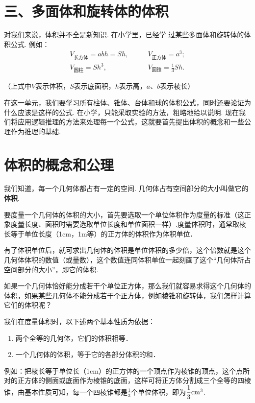 \section*{三、多面体和旋转体的体积}

对我们来说，体积并不全是新知识. 在小学里，已经学
过某些多面体和旋转体的体积公式. 例如：
\[\begin{split}
 V_{\text{长方体}}=abh=Sh,&\qquad V_{\text{正方体}}=a^3;\\
 V_{\text{圆柱}}=Sh^3,&\qquad V_{\text{圆锥}}=\frac{1}{3}Sh.   
\end{split}\]

（上式中$V$表示体积，$S$表示底面积，$h$表示高，$a$、$b$表示棱长）

在这一单元，我们要学习所有柱体、锥体、台体和球的体积公式，同时还要论证为什么应该是这样的公式. 在小学，只能采取实验的方法，粗略地给以说明. 现在我们将应用逻辑推理的方法来处理每一个公式，这就要首先提出体积的概念和一些公理作为推理的基础.

\section{体积的概念和公理}
我们知道，每一个几何体都占有一定的空间. 几何体占有空间部分的大小叫做它的\textbf{体积}.

要度量一个几何体的体积的大小，首先要选取一个单位体积作为度量的标准（这正象度量长度、面积时需要选取单位长度和单位面积一样）.度量体积时，通常取棱长等于单位长度（1cm，1m等）的正方体的体积作为体积单位．

有了体积单位后，就可求出几何体的体积是单位体积的多少倍，这个倍数就是这个几何体体积的数值（或量数），这个数值连同体积单位一起刻画了这个“几何体所占空间部分的大小”，即它的体积.

如果一个几何体恰好能分成若干个单位正方体，那么我们就容易求得这个几何体的体积，如果某些几何体不能分成若干个正方体，例如棱锥和旋转体，我们怎样计算它们的体积呢？

我们在度量体积时，以下述两个基本性质为依据：
\begin{enumerate}[(1)]
 \item 两个全等的几何体，它们的体积相等．
\item 一个几何体的体积，等于它的各部分体积的和．
\end{enumerate}

例如：把棱长等于单位长（1cm）的正方体的一个顶点作为棱锥的顶点，这个点所对的正方体的侧面或底面作为棱锥的底面，这样可将正方体分割成三个全等的四棱锥，由基本性质可知，每一个四棱锥都是$\frac{1}{3}$个单位体积，即为$\frac{1}{3}{\rm cm^3}$. 


